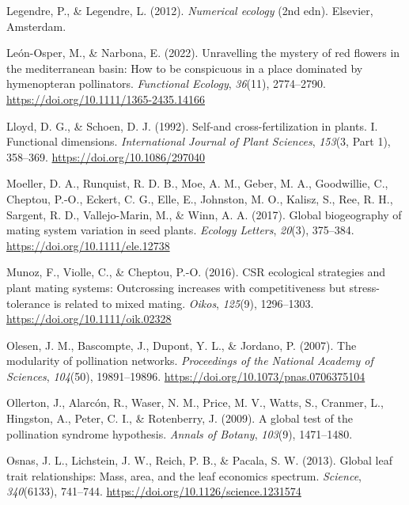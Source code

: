 \documentclass[
  12pt,
  a4paper,
]{article}
\newlength{\cslhangindent}
\newlength{\cslentryspacingunit} %
\newenvironment{CSLReferences}[2] %
 {%
  \setlength{\parindent}{0pt}
  \ifodd #1
  \let\oldpar\par
  \def\par{\hangindent=\cslhangindent\oldpar}
  \fi
  \setlength{\parskip}{#2\cslentryspacingunit}
 }%
 {}
\begin{document}
\begin{CSLReferences}{1}{0}
\leavevmode{}%
Legendre, P., \& Legendre, L. (2012). \emph{Numerical ecology} ({2nd edn}). {Elsevier, Amsterdam}.

\leavevmode{}%
León-Osper, M., \& Narbona, E. (2022). Unravelling the mystery of red flowers in the mediterranean basin: How to be conspicuous in a place dominated by hymenopteran pollinators. \emph{Functional Ecology}, \emph{36}(11), 2774--2790. \url{https://doi.org/10.1111/1365-2435.14166}

\leavevmode{}%
Lloyd, D. G., \& Schoen, D. J. (1992). Self-and cross-fertilization in plants. I. Functional dimensions. \emph{International Journal of Plant Sciences}, \emph{153}(3, Part 1), 358--369. \url{https://doi.org/10.1086/297040}

\leavevmode{}%
Moeller, D. A., Runquist, R. D. B., Moe, A. M., Geber, M. A., Goodwillie, C., Cheptou, P.-O., Eckert, C. G., Elle, E., Johnston, M. O., Kalisz, S., Ree, R. H., Sargent, R. D., Vallejo-Marin, M., \& Winn, A. A. (2017). Global biogeography of mating system variation in seed plants. \emph{Ecology Letters}, \emph{20}(3), 375--384. \url{https://doi.org/10.1111/ele.12738}

\leavevmode{}%
Munoz, F., Violle, C., \& Cheptou, P.-O. (2016). {CSR} ecological strategies and plant mating systems: Outcrossing increases with competitiveness but stress-tolerance is related to mixed mating. \emph{Oikos}, \emph{125}(9), 1296--1303. \url{https://doi.org/10.1111/oik.02328}

\leavevmode{}%
Olesen, J. M., Bascompte, J., Dupont, Y. L., \& Jordano, P. (2007). The modularity of pollination networks. \emph{Proceedings of the National Academy of Sciences}, \emph{104}(50), 19891--19896. \url{https://doi.org/10.1073/pnas.0706375104}

\leavevmode{}%
Ollerton, J., Alarcón, R., Waser, N. M., Price, M. V., Watts, S., Cranmer, L., Hingston, A., Peter, C. I., \& Rotenberry, J. (2009). A global test of the pollination syndrome hypothesis. \emph{Annals of Botany}, \emph{103}(9), 1471--1480.

\leavevmode{}%
Osnas, J. L., Lichstein, J. W., Reich, P. B., \& Pacala, S. W. (2013). Global leaf trait relationships: Mass, area, and the leaf economics spectrum. \emph{Science}, \emph{340}(6133), 741--744. \url{https://doi.org/10.1126/science.1231574}


\end{CSLReferences}
\end{document}
